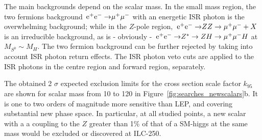 The main backgrounds depend on the scalar mass.
In
the small mass region, the two fermions background
$\mbox{$ {\, \mathrm e}^+ {\mathrm e}^- \to $} \mu^+ \mu^-$ with an energetic ISR
photon is the overwhelming background;
while in the $Z$-pole region,
$\mbox{$ {\, \mathrm e}^+ {\mathrm e}^- \to $} ZZ \rightarrow \mu^+ \mu^- + X$
is an irreducible background,
as is - obviously - $\mbox{$ {\, \mathrm e}^+ {\mathrm e}^- \to $} Z^* \rightarrow ZH \rightarrow \mu^+\mu^- H$
at $M_{S^0} \sim M_H$.
The two fermion background can be
further rejected by taking into account ISR photon return effects.
The ISR photon veto cuts are applied to the ISR photons in the
centre region and forward region, separately.

The obtained 2 $\sigma$ expected exclusion limits for the
cross section scale factor
$k_{95}$ are shown for scalar mass from 10 \GeV to 120 \GeV
in  Figure~\ref{fig:searches_newscalars}b.
It is one to two orders of magnitude more sensitive than LEP, and
covering substantial new phase space.
In particular,
at all studied points, a new scalar with a a coupling to the $Z$ greater
than 1\% of that of a SM-higgs at the same mass would be excluded or
discovered at ILC-250.
